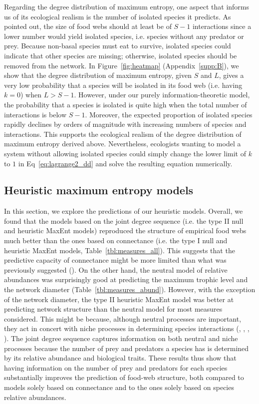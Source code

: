 Regarding the degree distribution of maximum entropy, one aspect that informs us
of its ecological realism is the number of isolated species it predicts. As
\textcite{MacDonald2020Revisiting} pointed out, the size of food webs should at
least be of $S-1$ interactions since a lower number would yield isolated
species, i.e. species without any predator or prey. Because non-basal species
must eat to survive, isolated species could indicate that other species are
missing; otherwise, isolated species should be removed from the network. In
Figure~\ref{fig:heatmap} (Appendix~\ref{supp:B}), we show that the degree
distribution of maximum entropy, given $S$ and $L$, gives a very low probability
that a species will be isolated in its food web (i.e. having $k = 0$) when $L >
S-1$. However, under our purely information-theoretic model, the probability
that a species is isolated is quite high when the total number of interactions
is below $S-1$. Moreover, the expected proportion of isolated species rapidly
declines by orders of magnitude with increasing numbers of species and
interactions. This supports the ecological realism of the degree distribution of
maximum entropy derived above. Nevertheless, ecologists wanting to model a
system without allowing isolated species could simply change the lower limit of
$k$ to $1$ in Eq~\ref{eq:lagrange2_dd} and solve the resulting equation
numerically.

\subsection{Heuristic maximum entropy models}

In this section, we explore the predictions of our heuristic models. Overall, we
found that the models based on the joint degree sequence (i.e. the type II null
and heuristic MaxEnt models) reproduced the structure of empirical food webs
much better than the ones based on connectance (i.e. the type I null and
heuristic MaxEnt models, Table~\ref{tbl:measures_all}). This suggests that the
predictive capacity of connectance might be more limited than what was
previously suggested (\cite{Poisot2014When}). On the other hand, the neutral
model of relative abundances was surprisingly good at predicting the maximum
trophic level and the network diameter (Table~\ref{tbl:measures_abund}). However,
with the exception of the network diameter, the type II heuristic MaxEnt model
was better at predicting network structure than the neutral model for most
measures considered. This might be because, although neutral processes are
important, they act in concert with niche processes in determining species
interactions (\cite{Bartomeus2016Common}, \cite{Canard2014Empirical},
\cite{Poisot2015Species}, \cite{Pomeranz2019Inferring}). The joint degree sequence
captures information on both neutral and niche processes because the number of
prey and predators a species has is determined by its relative abundance and
biological traits. These results thus show that having information on the number
of prey and predators for each species substantially improves the prediction of
food-web structure, both compared to models solely based on connectance and to
the ones solely based on species relative abundances.


